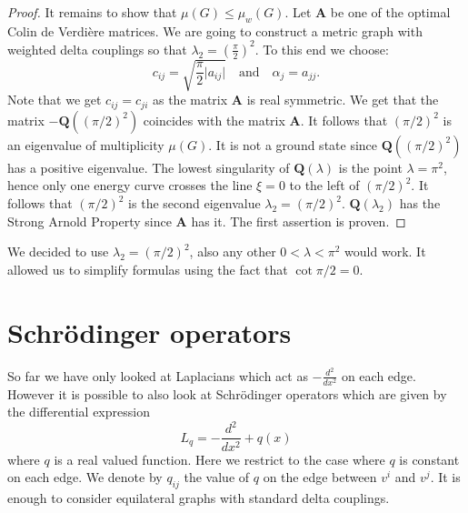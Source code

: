 \documentclass{amsart}
\theoremstyle{definition}
\theoremstyle{remark}
\numberwithin{equation}{section}
\begin{document}
{\begin{proof}
 It remains to show that $ \mu(G)\leq \mu_w (G) $.
Let $ \mathbf{A} $ be one of the optimal Colin de Verdi{\`e}re matrices. We are going to construct a metric graph with weighted  delta couplings
so that $ \lambda_2 = (\frac{\pi}{2})^2. $ To this end we choose:
\begin{equation}
c_{ij} = \sqrt{\frac{\pi}{2} \vert a_{ij} \vert} \quad \mbox{and} \quad \alpha_j = a_{jj}.
\end{equation}
Note that we get $ c_{ij} = c_{ji} $ as the matrix $\mathbf{A}$ is real symmetric.
We get that the matrix $ - \mathbf Q((\pi/2)^2) $ coincides with the matrix $ \mathbf{A} $.
It follows that $ (\pi/2)^2 $ is an eigenvalue of multiplicity $ \mu (G)$.
It is not a ground state since  $ \mathbf Q((\pi/2)^2)$ has a positive eigenvalue. 
The lowest singularity of $  \mathbf Q(\lambda) $ is the point $ \lambda = \pi^2$, hence
only one energy curve crosses the line $ \xi = 0 $ to the left of $ (\pi/2)^2$.
It follows that
$ (\pi/2)^2 $ is the second eigenvalue
$ \lambda_2=  (\pi/2)^2. $
$\mathbf Q(\lambda_2) $ has the Strong Arnold Property since $\mathbf{A}$ has it.
The first assertion is proven.
\end{proof}




We decided to use $ \lambda_2 = (\pi/2)^2 $, also any other $ 0 < \lambda < \pi^2 $ would work.
It allowed us to simplify formulas using the fact that $ \cot \pi/2 = 0 $.




\section{Schr\"odinger operators} \label{SecSch}

So far we have only looked at Laplacians which act as $-\frac{d^2}{d x^2}$ on each edge. However it is possible to also look at Schr\"odinger operators which are given by the differential expression
$$L_q = - \frac{d^2}{dx^2}+q(x)$$ 
where $q$ is a real valued function. Here we restrict to the case where $q$ is constant on each edge. We denote by $q_{ij}$ the value 
of $q$ on the edge between $v^i$ and $v^j$.
It is enough to consider
equilateral graphs with standard delta couplings.



}
\end{document}
